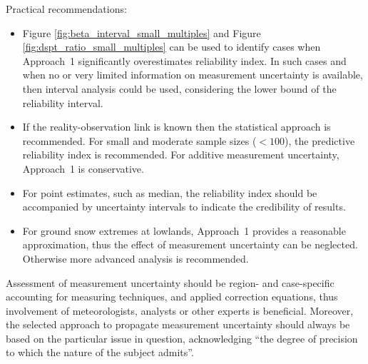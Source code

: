 Practical recommendations:
\begin{itemize}
	\item Figure \ref{fig:beta_interval_small_multiples} and Figure \ref{fig:dspt_ratio_small_multiples} can be used to identify cases when Approach~1 significantly overestimates reliability index. In such cases and when no or very limited information on measurement uncertainty is available, then interval analysis could be used, considering the lower bound of the reliability interval.
	\item If the reality-observation link is known then the statistical approach is recommended. For small and moderate sample sizes ($<100$), the predictive reliability index is recommended. For additive measurement uncertainty, Approach~1 is conservative.
	\item For point estimates, such as median, the reliability index should be accompanied by uncertainty intervals to indicate the credibility of results.
	\item For ground snow extremes at lowlands, Approach~1 provides a reasonable approximation, thus the effect of measurement uncertainty can be neglected. Otherwise more advanced analysis is recommended.
\end{itemize}

Assessment of measurement uncertainty should be region- and case-specific accounting for measuring techniques, and applied correction equations, thus involvement of meteorologists, analysts or other experts is beneficial. Moreover, the selected approach to propagate measurement uncertainty should always be based on the particular issue in question, acknowledging ``the degree of precision to which the nature of the subject admits''.